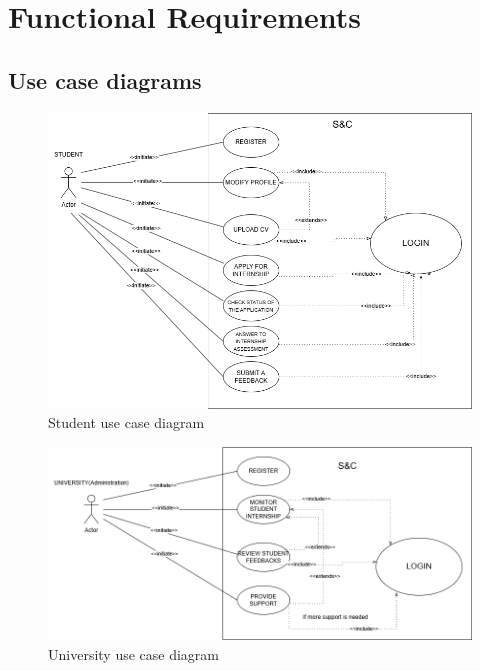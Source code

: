 \section{Functional Requirements}
\subsection{Use case diagrams}
\begin{figure}[ht!]
    \centering
    \includegraphics[scale=0.40]{Images/ImagesRASD/ScenariosStateDiagram-UseCaseDiagrams_Student.drawio.png}
    \caption{Student use case diagram}
\end{figure}

\begin{figure}[ht!]
    \centering
    \includegraphics[scale=0.40]{Images/ImagesRASD/ScenariosStateDiagram-UseCaseDiagram_Universities.drawio.png}
    \caption{University use case diagram}

\end{figure}

